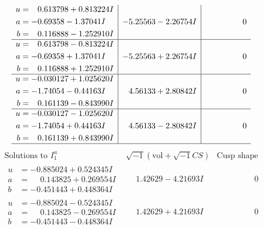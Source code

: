\documentclass[1p]{elsarticle_modified}
\theoremstyle{definition}
\newcommand{\I}{\sqrt{-1}}
\begin{document}
$$\begin{array}{c|c|c}
\begin{aligned}
u &= \phantom{-}0.613798 + 0.813224 I \\
a &= -0.69358 - 1.37041 I \\
b &= \phantom{-}0.116888 - 1.252910 I\end{aligned}
 & -5.25563 - 2.26754 I & \phantom{-0.000000 } 0 \\ \hline\begin{aligned}
u &= \phantom{-}0.613798 - 0.813224 I \\
a &= -0.69358 + 1.37041 I \\
b &= \phantom{-}0.116888 + 1.252910 I\end{aligned}
 & -5.25563 + 2.26754 I & \phantom{-0.000000 } 0 \\ \hline\begin{aligned}
u &= -0.030127 + 1.025620 I \\
a &= -1.74054 - 0.44163 I \\
b &= \phantom{-}0.161139 - 0.843990 I\end{aligned}
 & \phantom{-}4.56133 + 2.80842 I & \phantom{-0.000000 } 0 \\ \hline\begin{aligned}
u &= -0.030127 - 1.025620 I \\
a &= -1.74054 + 0.44163 I \\
b &= \phantom{-}0.161139 + 0.843990 I\end{aligned}
 & \phantom{-}4.56133 - 2.80842 I & \phantom{-0.000000 } 0\\
 \hline 
 \end{array}$$\newpage$$\begin{array}{c|c|c}  
\text{Solutions to }I^u_{1}& \I (\text{vol} + \sqrt{-1}CS) & \text{Cusp shape}\\
 \hline 
\begin{aligned}
u &= -0.885024 + 0.524345 I \\
a &= \phantom{-}0.143825 + 0.269554 I \\
b &= -0.451443 + 0.448364 I\end{aligned}
 & \phantom{-}1.42629 - 4.21693 I & \phantom{-0.000000 } 0 \\ \hline\begin{aligned}
u &= -0.885024 - 0.524345 I \\
a &= \phantom{-}0.143825 - 0.269554 I \\
b &= -0.451443 - 0.448364 I\end{aligned}
 & \phantom{-}1.42629 + 4.21693 I & \phantom{-0.000000 } 0 \\ \hline\begin{aligned}

\end{aligned}
\end{array}$$
\end{document}
